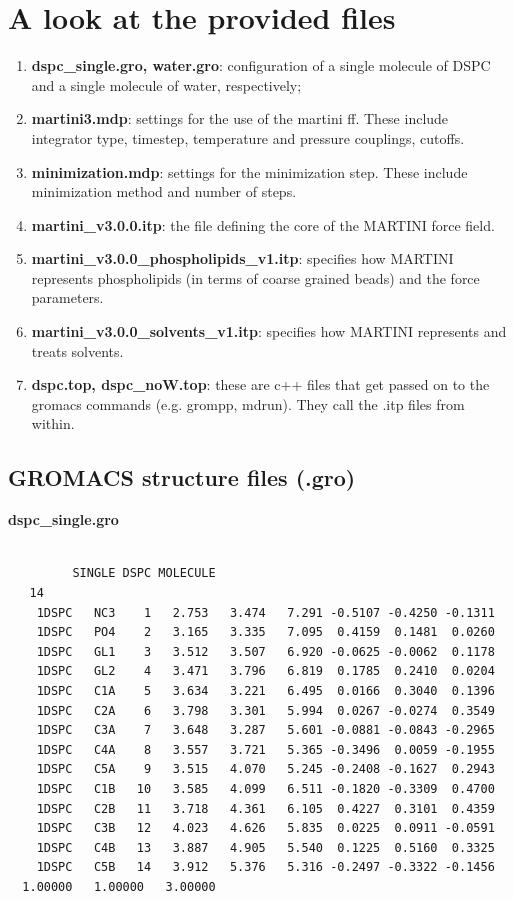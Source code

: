 \section{A look at the provided files}

\begin{enumerate}
\item \textbf{dspc\_single.gro, water.gro}: configuration of a single molecule of DSPC and a single molecule of water, respectively;
\item \textbf{martini3.mdp}: settings for the use of the martini ff. These include integrator type, timestep, temperature and pressure couplings, cutoffs.
\item \textbf{minimization.mdp}: settings for the minimization step. These include minimization method and number of steps.
\item \textbf{martini\_v3.0.0.itp}: the file defining the core of the MARTINI force field.
\item \textbf{martini\_v3.0.0\_phospholipids\_v1.itp}: specifies how MARTINI represents phospholipids (in terms of coarse grained beads) and the force parameters.
\item \textbf{martini\_v3.0.0\_solvents\_v1.itp}: specifies how MARTINI represents and treats solvents.
\item \textbf{dspc.top, dspc\_noW.top}: these are c++ files that get passed on to the gromacs commands (e.g. grompp, mdrun). They call the .itp files from within. 
\end{enumerate}

\subsection{GROMACS structure files (.gro)}
\begin{vlinesbox}
\fontsize{8pt}{7pt}\selectfont
\textbf{dspc\_single.gro}
\begin{verbatim}

         SINGLE DSPC MOLECULE
   14
    1DSPC   NC3    1   2.753   3.474   7.291 -0.5107 -0.4250 -0.1311
    1DSPC   PO4    2   3.165   3.335   7.095  0.4159  0.1481  0.0260
    1DSPC   GL1    3   3.512   3.507   6.920 -0.0625 -0.0062  0.1178
    1DSPC   GL2    4   3.471   3.796   6.819  0.1785  0.2410  0.0204
    1DSPC   C1A    5   3.634   3.221   6.495  0.0166  0.3040  0.1396
    1DSPC   C2A    6   3.798   3.301   5.994  0.0267 -0.0274  0.3549
    1DSPC   C3A    7   3.648   3.287   5.601 -0.0881 -0.0843 -0.2965
    1DSPC   C4A    8   3.557   3.721   5.365 -0.3496  0.0059 -0.1955
    1DSPC   C5A    9   3.515   4.070   5.245 -0.2408 -0.1627  0.2943
    1DSPC   C1B   10   3.585   4.099   6.511 -0.1820 -0.3309  0.4700
    1DSPC   C2B   11   3.718   4.361   6.105  0.4227  0.3101  0.4359
    1DSPC   C3B   12   4.023   4.626   5.835  0.0225  0.0911 -0.0591
    1DSPC   C4B   13   3.887   4.905   5.540  0.1225  0.5160  0.3325
    1DSPC   C5B   14   3.912   5.376   5.316 -0.2497 -0.3322 -0.1456
  1.00000   1.00000   3.00000
    \end{verbatim}
\end{vlinesbox}


